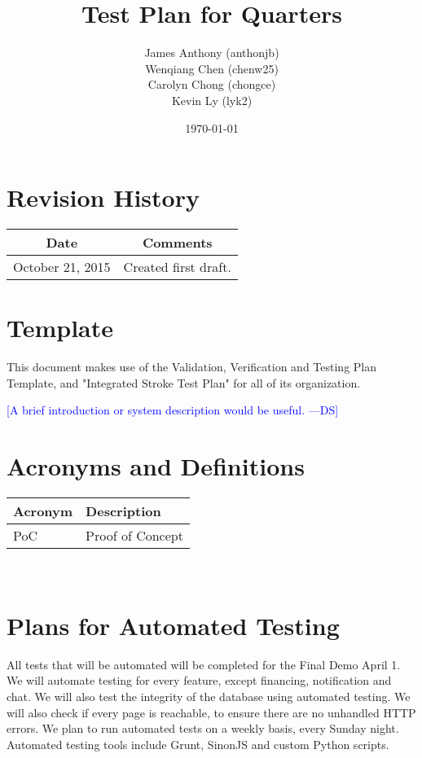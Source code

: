 \documentclass[12pt]{article}
\newcommand{\authornote}[3]{\textcolor{#1}{[#3 ---#2]}}
\newcommand{\authornote}[3]{}
\newcommand{\ds}[1]{\authornote{blue}{DS}{#1}}
\begin{document}
\title{Test Plan for Quarters} 
\author{James Anthony (anthonjb)\\ Wenqiang Chen (chenw25)\\ Carolyn Chong 
(chongce)\\ Kevin Ly (lyk2)}
\date{\today}
  
\maketitle

\pagebreak

\tableofcontents

\section*{Revision History}
\begin{tabular}{|c|c|}
\hline
\textbf{Date}  & \textbf{Comments} \\ \hline
October 21, 2015 & Created first draft. \\ 
\hline
\end{tabular}

\section*{Template}
This document makes use of the Validation, Verification and Testing Plan Template, and "Integrated Stroke Test Plan" for all of its organization.

\ds{A brief introduction or system description would be useful.}

\pagebreak


\section{Acronyms and Definitions}
\renewcommand{\arraystretch}{1.2}
\begin{tabular}{l l} 
  \toprule    
  \textbf{Acronym} & \textbf{Description}\\
  \midrule 
  PoC   &Proof of Concept\\
  \bottomrule
\end{tabular}\\


\section{Plans for Automated Testing}
All tests that will be automated will be completed for the Final Demo April 1. We will automate testing for every feature, except financing, notification and chat. We will also test the integrity of the database using automated testing. We will also check if every page is reachable, to ensure there are no unhandled HTTP errors. We plan to run automated tests on a weekly basis, every Sunday night. Automated testing tools include Grunt, SinonJS and custom Python scripts. 
\end{document}
